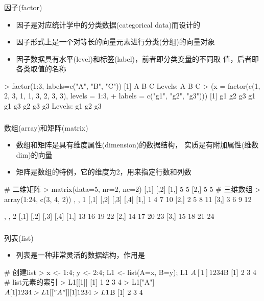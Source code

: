 \begin{frame}[t,fragile]{\subsecname}{\subsubsecname}
  \frametitle{}{因子(factor)}
  \begin{itemize}
  \item 因子是对应统计学中的分类数据(categorical data)而设计的
  \item 因子形式上是一个对等长的向量元素进行分类(分组)的向量对象
  \item 因子数据具有水平(level)和标签(label)，前者即分类变量的不同取
值，后者即各类取值的名称
  \end{itemize}  

\begin{rcode}
> factor(1:3, labels=c("A", "B", "C"))
[1] A B C
Levels: A B C
> (x = factor(c(1, 2, 3, 1, 1, 3, 2, 3, 3), levels = 1:3,
+   labels = c("g1", "g2", "g3")))
[1] g1 g2 g3 g1 g1 g3 g2 g3 g3
Levels: g1 g2 g3
\end{rcode}  
\end{frame}

\begin{frame}[t,fragile]{\subsecname}{\subsubsecname}
  \frametitle{}{数组(array)和矩阵(matrix)}
  \begin{itemize}
  \item 数组和矩阵是具有维度属性(dimension)的数据结构，
        实质是有附加属性(维数dim)的向量
  \item 矩阵是数组的特例，它的维度为2，用来指定行数和列数
  \end{itemize}  

\begin{rcode}
# 二维矩阵
> matrix(data=5, nr=2, nc=2)
     [,1] [,2]
[1,]    5    5
[2,]    5    5
# 三维数组
> array(1:24, c(3, 4, 2))
, , 1
     [,1] [,2] [,3] [,4]
[1,]    1    4    7   10
[2,]    2    5    8   11
[3,]    3    6    9   12

, , 2
     [,1] [,2] [,3] [,4]
[1,]   13   16   19   22
[2,]   14   17   20   23
[3,]   15   18   21   24
\end{rcode}  
\end{frame}

\begin{frame}[t,fragile]{\subsecname}{\subsubsecname}
  \frametitle{}{列表(list)}
  \begin{itemize}
  \item 列表是一种非常灵活的数据结构，作用是
  \end{itemize}  

\begin{rcode}
# 创建list
> x <- 1:4; y <- 2:4; L1 <- list(A=x, B=y); L1
$A
[1] 1 2 3 4

$B
[1] 2 3 4
# list元素的索引
> L1[[1]]
[1] 1 2 3 4
> L1["A"]
$A
[1] 1 2 3 4
> L1[["A"]]
[1] 1 2 3 4
> L1$B
[1] 2 3 4
\end{rcode}  
\end{frame}

